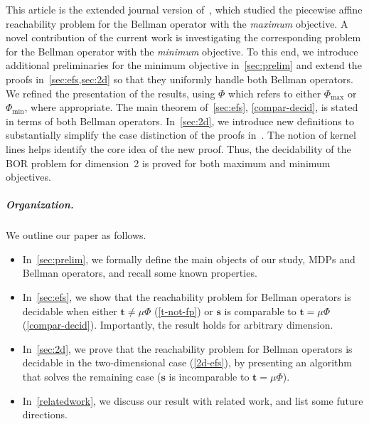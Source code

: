 \documentclass[preprint,12pt]{elsarticle}
\theoremstyle{plain}
\theoremstyle{definition}
\theoremstyle{remark}
\theoremstyle{claimstyle}
\begin{document}
This article is the extended journal version of~\cite{VaronkaW25}, which studied the piecewise affine reachability problem for the Bellman operator with the \emph{maximum} objective.
A novel contribution of the current work is investigating the corresponding problem for the Bellman operator with the \emph{minimum} objective.
To this end, we introduce additional preliminaries for the minimum objective in~\cref{sec:prelim} and extend the proofs in~\cref{sec:efs,sec:2d} so that they uniformly handle both Bellman operators.
We refined the presentation of the results, using $\Phi$ which refers to either $\Phi_{\max}$ or $\Phi_{\min}$, 
where appropriate. 
The main theorem of~\cref{sec:efs}, \cref{compar-decid}, is stated in terms of both Bellman operators.
In~\cref{sec:2d}, we introduce new definitions to substantially simplify the case distinction of the proofs in~\cite{VaronkaW25}. 
The notion of kernel lines helps identify the core idea of the new proof. 
Thus, the decidability of the BOR problem for dimension~2 is proved for both maximum and minimum objectives.














\subparagraph{Organization.}
We outline our paper as follows. 
\begin{itemize}
	\item In~\cref{sec:prelim}, we formally define the main objects of our study, MDPs and Bellman operators, and recall some known properties. 
	\item In~\cref{sec:efs}, we show that the reachability problem for Bellman operators is decidable when either $\bm{t} \not = \mu\Phi$ (\cref{t-not-fp}) or $\bm{s}$ is comparable to $\bm{t} = \mu\Phi$ (\cref{compar-decid}). 
	Importantly, the result holds for arbitrary dimension. 
	\item In~\cref{sec:2d}, we prove that the reachability problem for Bellman operators is decidable in the two-dimensional case (\cref{2d-efs}), by presenting an algorithm that solves the remaining case ($\bm{s}$ is incomparable to $\bm{t} = \mu\Phi$). 
	\item In~\cref{relatedwork}, we discuss our result with related work, and list some future directions. 
\end{itemize}
\end{document}
